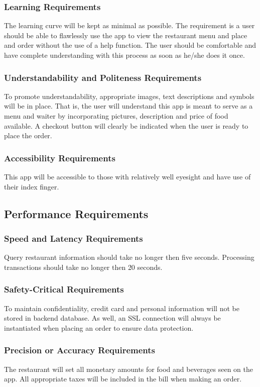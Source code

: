 \documentclass[12pt, titlepage]{article}
\begin{document}
\subsubsection{Learning Requirements}
The learning curve will be kept as minimal as possible. The requirement is a user should be able to flawlessly use the app to view the restaurant menu and place and order without the use of a help function. The user should be comfortable and have complete understanding with this process as soon as he/she does it once.
\subsubsection{Understandability and Politeness Requirements}
To promote understandability, appropriate images, text descriptions and symbols will be in place. That is, the user will understand this app is meant to serve as a menu and waiter by incorporating pictures, description and price of food available. A checkout button will clearly be indicated when the user is ready to place the order.
\subsubsection{Accessibility Requirements}
This app will be accessible to those with relatively well eyesight and have use of their index finger. 
 
\subsection{Performance Requirements}

\subsubsection{Speed and Latency Requirements}
Query restaurant information should take no longer then five seconds. Processing transactions should take no longer then 20 seconds.  

\subsubsection{Safety-Critical Requirements}
To maintain confidentiality, credit card and personal information will not be stored in backend database. As well, an SSL connection will always be instantiated when placing an order to ensure data protection. 
\subsubsection{Precision or Accuracy Requirements}
The restaurant will set all monetary amounts for food and beverages seen on the app. All appropriate taxes will be included in the bill when making an order.  
\end{document}
